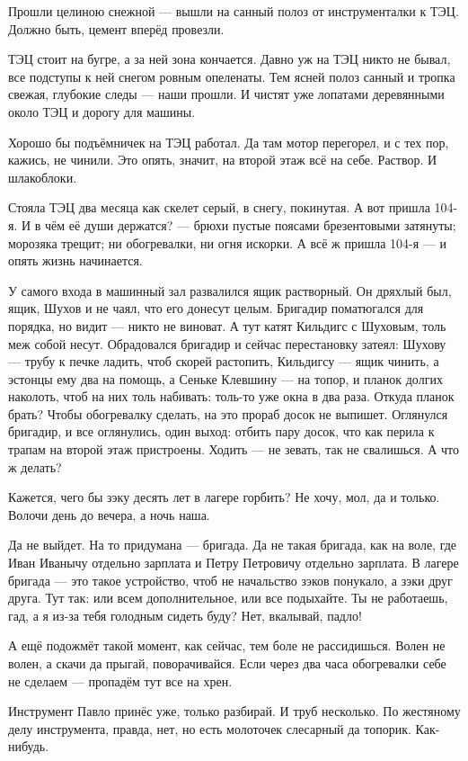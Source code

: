 Прошли целиною снежной --- вышли на санный полоз от инструменталки к ТЭЦ. Должно быть, цемент
вперёд провезли.

ТЭЦ стоит на бугре, а за ней зона кончается. Давно уж на ТЭЦ никто не бывал, все подступы к ней
снегом ровным опеленаты. Тем ясней полоз санный и тропка свежая, глубокие следы --- наши
прошли. И чистят уже лопатами деревянными около ТЭЦ и дорогу для машины.

Хорошо бы подъёмничек на ТЭЦ работал. Да там мотор перегорел, и с тех пор, кажись, не чинили.
Это опять, значит, на второй этаж всё на себе. Раствор. И шлакоблоки.

Стояла ТЭЦ два месяца как скелет серый, в снегу, покинутая. А вот пришла 104-я. И в чём её души
держатся? --- брюхи пустые поясами брезентовыми затянуты; морозяка трещит; ни обогревалки, ни
огня искорки. А всё ж пришла 104-я --- и опять жизнь начинается.

У самого входа в машинный зал развалился ящик растворный. Он дряхлый был, ящик, Шухов и не
чаял, что его донесут целым. Бригадир поматюгался для порядка, но видит --- никто не виноват. А
тут катят Кильдигс с Шуховым, толь меж собой несут. Обрадовался бригадир и сейчас
перестановку затеял: Шухову --- трубу к печке ладить, чтоб скорей растопить, Кильдигсу --- ящик
чинить, а эстонцы ему два на помощь, а Сеньке Клевшину --- на топор, и планок долгих наколоть,
чтоб на них толь набивать: толь-то уже окна в два раза. Откуда планок брать? Чтобы обогревалку
сделать, на это прораб досок не выпишет. Оглянулся бригадир, и все оглянулись, один выход:
отбить пару досок, что как перила к трапам на второй этаж пристроены. Ходить --- не зевать, так
не свалишься. А что ж делать?

Кажется, чего бы зэку десять лет в лагере горбить? Не хочу, мол, да и только. Волочи день до
вечера, а ночь наша.

Да не выйдет. На то придумана --- бригада. Да не такая бригада, как на воле, где Иван Иванычу
отдельно зарплата и Петру Петровичу отдельно зарплата. В лагере бригада --- это такое
устройство, чтоб не начальство зэков понукало, а зэки друг друга. Тут так: или всем
дополнительное, или все подыхайте. Ты не работаешь, гад, а я из-за тебя голодным сидеть буду?
Нет, вкалывай, падло!

А ещё подожмёт такой момент, как сейчас, тем боле не рассидишься. Волен не волен, а скачи да
прыгай, поворачивайся. Если через два часа обогревалки себе не сделаем --- пропадём тут все на
хрен.

Инструмент Павло принёс уже, только разбирай. И труб несколько. По жестяному делу
инструмента, правда, нет, но есть молоточек слесарный да топорик. Как-нибудь.

